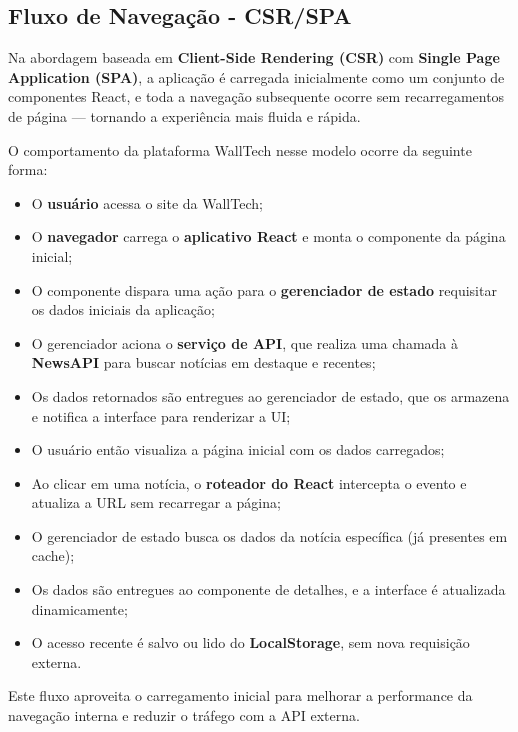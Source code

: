 \subsection{Fluxo de Navegação - CSR/SPA}
\label{subsec:fluxo-csr}

Na abordagem baseada em \textbf{Client-Side Rendering (CSR)} com \textbf{Single Page Application (SPA)}, a aplicação é carregada inicialmente como um conjunto de componentes React, e toda a navegação subsequente ocorre sem recarregamentos de página — tornando a experiência mais fluida e rápida.

O comportamento da plataforma WallTech nesse modelo ocorre da seguinte forma:

\begin{itemize}
  \item O \textbf{usuário} acessa o site da WallTech;
  \item O \textbf{navegador} carrega o \textbf{aplicativo React} e monta o componente da página inicial;
  \item O componente dispara uma ação para o \textbf{gerenciador de estado} requisitar os dados iniciais da aplicação;
  \item O gerenciador aciona o \textbf{serviço de API}, que realiza uma chamada à \textbf{NewsAPI} para buscar notícias em destaque e recentes;
  \item Os dados retornados são entregues ao gerenciador de estado, que os armazena e notifica a interface para renderizar a UI;
  \item O usuário então visualiza a página inicial com os dados carregados;
  \item Ao clicar em uma notícia, o \textbf{roteador do React} intercepta o evento e atualiza a URL sem recarregar a página;
  \item O gerenciador de estado busca os dados da notícia específica (já presentes em cache);
  \item Os dados são entregues ao componente de detalhes, e a interface é atualizada dinamicamente;
  \item O acesso recente é salvo ou lido do \textbf{LocalStorage}, sem nova requisição externa.
\end{itemize}

Este fluxo aproveita o carregamento inicial para melhorar a performance da navegação interna e reduzir o tráfego com a API externa.

